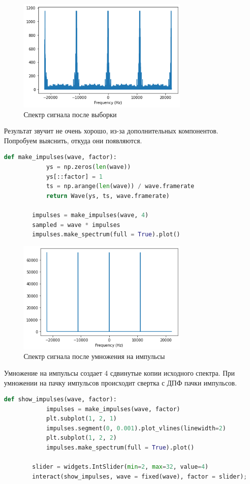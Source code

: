 \documentclass[a4paper, 12pt]{report}
\begin{document}
	\begin{figure}[H]
		\centering
		\includegraphics[width=0.75\textwidth]{samp3.png}
		\caption{Спектр сигнала после выборки}
		\label{fig:samp3}
	\end{figure}
	Результат звучит не очень хорошо, из-за дополнительных компонентов. Попробуем выяснить, откуда они появляются.
	\begin{lstlisting}[language=Python,caption=Функция для создания явных импульсов]
		def make_impulses(wave, factor):
			ys = np.zeros(len(wave))
			ys[::factor] = 1
			ts = np.arange(len(wave)) / wave.framerate
			return Wave(ys, ts, wave.framerate)

		impulses = make_impulses(wave, 4)
		sampled = wave * impulses
		impulses.make_spectrum(full = True).plot()
	\end{lstlisting}
	\begin{figure}[H]
		\centering
		\includegraphics[width=0.75\textwidth]{samp4.png}
		\caption{Спектр сигнала после умножения на импульсы}
		\label{fig:samp4}
	\end{figure}
	Умножение на импульсы создает 4 сдвинутые копии исходного спектра. При умножении на пачку импульсов происходит свертка с ДПФ пачки импульсов.
	\begin{lstlisting}[language=Python,caption=Изменение количества импульсов]
		def show_impulses(wave, factor):
			impulses = make_impulses(wave, factor)
			plt.subplot(1, 2, 1)
			impulses.segment(0, 0.001).plot_vlines(linewidth=2)
			plt.subplot(1, 2, 2)
			impulses.make_spectrum(full = True).plot()

		slider = widgets.IntSlider(min=2, max=32, value=4)
		interact(show_impulses, wave = fixed(wave), factor = slider);
	\end{lstlisting}
\end{document}

